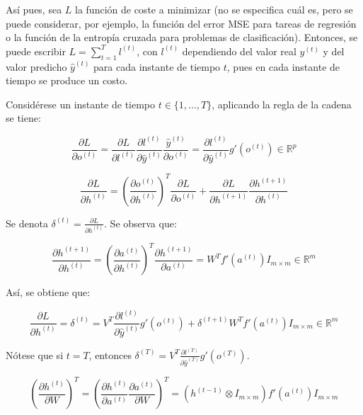 \documentclass[12pt,twoside]{article}
\begin{document}
Así pues, sea $L$ la función de coste a minimizar (no se especifica cuál es, pero se puede considerar, por ejemplo, la función del error MSE para tareas de regresión o la función de la entropía cruzada para problemas de clasificación). Entonces, se puede escribir $L = \sum_{t=1}^{T} l^{(t)}$, con $l^{(t)}$ dependiendo del valor real $y^{(t)}$ y del valor predicho $\hat{y}^{(t)}$ para cada instante de tiempo $t$, pues en cada instante de tiempo se produce un costo.

Considérese un instante de tiempo $t \in \{1,...,T\}$, aplicando la regla de la cadena se tiene: 

\begin{equation}
\frac{\partial L}{\partial o^{(t)}} = \frac{\partial L}{\partial l^{(t)}} \frac{\partial l^{(t)}}{\partial \hat{y}^{(t)}} \frac{\hat{y}^{(t)}}{\partial o^{(t)}} = \frac{\partial l^{(t)}}{\partial \hat{y}^{(t)}} g'(o^{(t)}) \in \mathbb{R}^p
\end{equation}

\begin{equation}
\frac{\partial L}{\partial h^{(t)}} = \left( \frac{\partial o^{(t)}}{\partial h^{(t)}} \right )^T \frac{\partial L}{\partial o^{(t)}} + \frac{\partial L}{\partial h^{(t+1)}}\frac{\partial h^{(t+1)}}{\partial h^{(t)}}
\end{equation}

Se denota $\delta^{(t)} = \frac{\partial L}{\partial h^{(t)}}$. Se observa que:

\begin{equation}
\frac{\partial h^{(t+1)}}{\partial h^{(t)}} = \left( \frac{\partial a^{(t)}}{\partial h^{(t)}} \right)^T \frac{\partial h^{(t+1)}}{\partial a^{(t)}} = W^T f'(a^{(t)})I_{m \times m} \in \mathbb{R}^m
\end{equation}

Así, se obtiene que:

\begin{equation}
\frac{\partial L}{\partial h^{(t)}} = \delta^{(t)} = V^T \frac{\partial l^{(t)}}{\partial \hat{y}^{(t)}} g'(o^{(t)}) + \delta^{(t+1)} W^T f'(a^{(t)})I_{m \times m} \in \mathbb{R}^m
\end{equation}

Nótese que si $t=T$, entonces $\delta^{(T)} = V^T \frac{\partial l^{(T)}}{\partial \hat{y}^{(T)}} g'(o^{(T)})$.

\begin{equation}
\left( \frac{\partial h^{(t)}}{\partial W} \right)^T = \left( \frac{\partial h^{(t)}}{\partial a^{(t)}} \frac{\partial a^{(t)}}{\partial W} \right)^T = (h^{(t-1)} \otimes I_{m \times m}) f'(a^{(t)}) I_{m \times m}
\end{equation}
\end{document}
